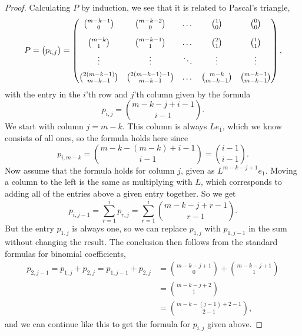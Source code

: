 \begin{proof}
  Calculating $P$ by induction, we see that it is related to
  Pascal's triangle,
  \[ P =
  \begin{pmatrix}
    p_{i,j}
  \end{pmatrix}
  =
  \begin{pmatrix}
    {m-k-1 \choose 0}\vspace{1em} & {m-k-2\choose 0} & \dots &
    {1\choose 0} & {0 \choose 0} \\
    {m-k \choose 1} \vspace{0.5em} & {m-k-1 \choose 1} & \dots & {2
      \choose 1} & {1 \choose 1} \\
    \vdots \vspace{0.5em} & \vdots & \ddots & \vdots & \vdots\\
    {2(m-k-1) \choose {m-k-1}} & {2(m-k-1)-1 \choose m-k-1} & \dots &
    {m-k \choose m-k-1} & {m-k-1 \choose m-k-1}
  \end{pmatrix}, \]
  with the entry in the $i$'th row and $j$'th column given by the
  formula
  \[ p_{i,j} = { m-k-j+i-1 \choose i-1}. \] 
  We start with column $j=m-k$. This column is always $Le_1$, which we
  know consists of all ones, so the formula holds here since
  \[ p_{i,m-k} = { m-k-(m-k)+i-1 \choose i-1} = {i-1\choose i-1}. \] 
  Now assume that the formula holds for column
  $j$, given as $L^{m-k-j+1}e_1$. Moving a column to the left is the
  same as multiplying with $L$, which corresponds to
  adding all of the entries above a given entry together. So we get
  \[ p_{i,j-1} = \sum_{r=1}^{i} p_{r,j}  =  \sum_{r=1}^i { m-k-j+r-1
    \choose r-1}.  \]
  But the entry $p_{1,j}$ is always one, so we can replace
  $p_{1,j}$ with $p_{1,j-1}$ in the sum without changing the
  result. The conclusion then follows from the standard formulas for
  binomial coefficients,
  \begin{align*}
    p_{2,j-1} = p_{1,j} + p_{2,j} 
    = p_{1,j-1} + p_{2,j} &= {m-k-j+1\choose 0} + {m-k-j+1 \choose
                            1}\\
                          &= {m-k-j+2\choose 1}\\
                          &= {m-k-(j-1)+2-1\choose 2-1},
  \end{align*}
  and we can continue like this to get the formula for $p_{i,j}$
  given above.
  

\end{proof}

